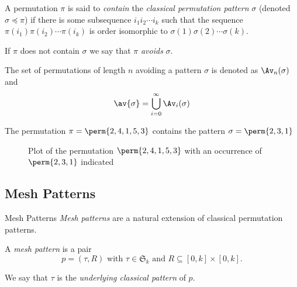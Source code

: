 \begin{frame}
  \begin{definition}
    A permutation \(\pi\) is said to \emph{contain} the \emph{classical
    permutation pattern} \(\sigma\)
    (denoted \(\sigma \preceq \pi\)) if there is some
    subsequence \(i_1i_2\dotsm{}i_k\) such that the sequence
    \(\pi(i_1)\pi(i_2)\dotsm\pi(i_k)\) is order isomorphic to
    \(\sigma(1)\sigma(2)\dotsm\sigma(k)\).
  \end{definition}

  If \(\pi\) does not contain \(\sigma\) we say that \(\pi\) \emph{avoids}
  \(\sigma\).

  The set of permutations of length \(n\) avoiding a pattern \(\sigma\) is
  denoted as \(\Av_n(\sigma)\) and
  \begin{equation*}
    \av{\sigma} = \bigcup_{i=0}^{\infty}\Av_i(\sigma)
  \end{equation*}
\end{frame}

\begin{frame}
  \begin{example}
    The permutation \(\pi = \perm{2,4,1,5,3}\) contains the pattern
    \(\sigma = \perm{2,3,1}\)
    \begin{figure}[htb]
      \centering
      \caption{Plot of the permutation \(\perm{2,4,1,5,3}\) with an occurrence
      of \(\perm{2,3,1}\) indicated}
    \end{figure}
  \end{example}
\end{frame}

\subsection{Mesh Patterns}
\label{sub:Mesh Patterns}
\begin{frame}{Mesh Patterns}
  \emph{Mesh patterns} are a natural extension of classical permutation patterns.
  \begin{definition}
    A \emph{mesh pattern} is a pair
    \begin{equation*}
      p = (\tau,R)\text{ with } \tau \in \mathfrak{S}_k \text{ and } R \subseteq
      [0,k]\times [0,k].
    \end{equation*}
  \end{definition}
  We say that \(\tau\) is the \emph{underlying classical pattern} of \(p\).
\end{frame}

